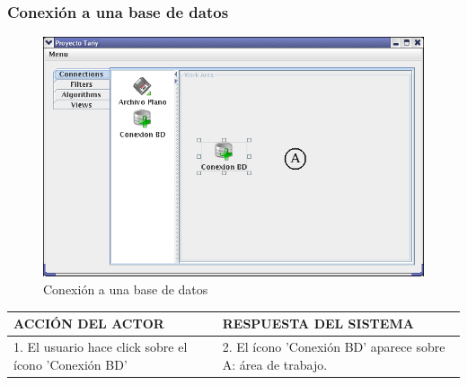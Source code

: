 \subsubsection{Conexi\'on a una base de datos}
\begin{figure}[ht]
\centering
\includegraphics[width=1\textwidth]{images/06.png}
\caption{Conexi\'on a una base de datos}
\end{figure}
\begin{center}
\begin{tabular}{|p{60mm}|p{60mm}|} \hline
ACCI\'ON DEL ACTOR & RESPUESTA DEL SISTEMA \\ \hline
1. El usuario hace click sobre el \'icono 'Conexi\'on BD' & 2. El \'icono 'Conexi\'on BD' aparece sobre A: \'area de trabajo.\\ \hline
\end{tabular}
\end{center}

\newpage
